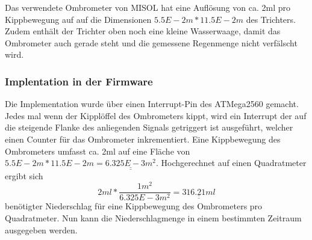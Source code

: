 Das verwendete Ombrometer von MISOL hat eine Auflösung von ca. 2ml pro Kippbewegung auf auf die Dimensionen $5.5E-2m*11.5E-2m$ des Trichters. Zudem enthält der Trichter oben noch eine kleine Wasserwaage, damit das Ombrometer auch gerade steht und die gemessene Regenmenge nicht verfälscht wird.\\

\subsubsection*{Implentation in der Firmware}
Die Implementation wurde über einen Interrupt-Pin des ATMega2560 gemacht. Jedes mal wenn der Kipplöffel des Ombrometers kippt, wird ein Interrupt der auf die steigende Flanke des anliegenden Signals getriggert ist ausgeführt, welcher einen Counter für das Ombrometer inkrementiert. Eine Kippbewegung des Ombrometers umfasst ca. 2ml auf eine Fläche von $5.5E-2m*11.5E-2m=\underline{\underline{6.325E-3m^{2}}}$. Hochgerechnet auf einen Quadratmeter ergibt sich
\begin{equation}
2ml*\dfrac{1m^{2}}{6.325E-3m^{2}} = \underline{\underline{316.21ml}}
\end{equation}
benötigter Niederschlag für eine Kippbewegung des Ombrometers pro Quadratmeter. Nun kann die Niederschlagmenge in einem bestimmten Zeitraum ausgegeben werden.\\